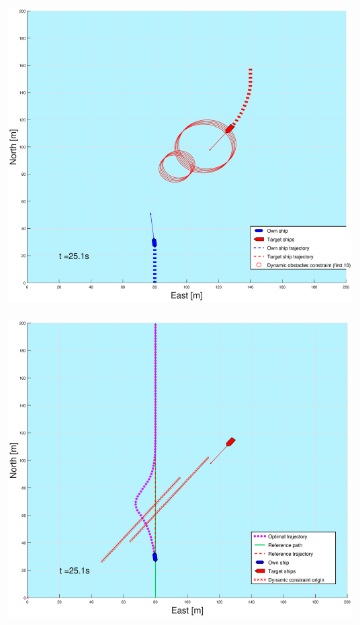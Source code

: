\begin{figure}[!b]
\begin{subfigure}[b]{0.499\textwidth}
    \end{subfigure}
    \hfill
    \\
    \begin{subfigure}[b]{0.49\textwidth}
        \centering
        \includegraphics[width=\textwidth]{Images/Figures/sving_GW/_Simple_1fig1_time=25}
    \end{subfigure}
    \hfill
    \begin{subfigure}[b]{0.499\textwidth}
        \centering
        \includegraphics[width=\textwidth]{Images/Figures/sving_GW/_Simple_1fig999_time=25}

\end{subfigure}
\end{figure}
